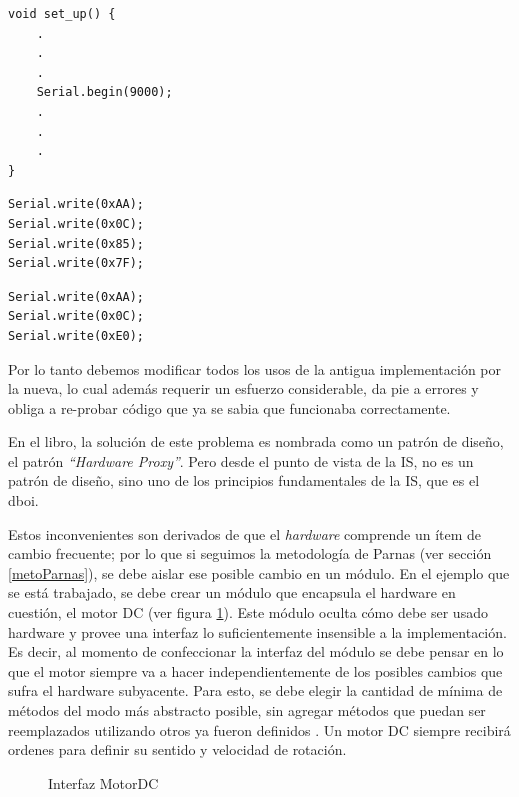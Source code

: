 \begin{itemize}
\begin{lstlisting}[caption=Configuración del motor paso a paso que utiliza comunicación serie., label={listingDistinto}]
void set_up() {
    .
    .
    .
    Serial.begin(9000);
    .
    .
    .
}
    \end{lstlisting}
\begin{lstlisting}[caption=Configurar máxima velocidad giro horario para el caso de comunicación en serie., label={maxSerial}]
Serial.write(0xAA);
Serial.write(0x0C);
Serial.write(0x85);
Serial.write(0x7F);
\end{lstlisting}
\begin{lstlisting}[caption=Configurar detención para el caso de comunicación en serie., label={detSerial}]
Serial.write(0xAA);
Serial.write(0x0C);
Serial.write(0xE0);
\end{lstlisting}
    Por lo tanto debemos modificar todos los usos de la antigua implementación por la nueva, lo cual además requerir un esfuerzo considerable, da pie a errores y obliga a re-probar código que ya se sabia que funcionaba correctamente.
\end{itemize}

En el libro, la solución de este problema es nombrada como un patrón de diseño, el patrón \textit{``Hardware Proxy''}. Pero desde el punto de vista de la IS, no es un patrón de diseño, sino uno de los principios fundamentales de la  IS, que es el \gls{dboi}.

Estos inconvenientes son derivados de que el \textit{hardware} comprende un ítem de cambio frecuente; por lo que si seguimos la metodología de Parnas (ver sección \ref{metoParnas}), se debe aislar ese posible cambio en un módulo. En el ejemplo que se está trabajado, se debe crear un módulo que encapsula el hardware en cuestión, el motor \gls{DC} (ver figura \ref{interfazMotor}). Este módulo oculta cómo debe ser usado hardware y provee una interfaz lo suficientemente insensible a la implementación. Es decir, al momento de confeccionar la interfaz del módulo se debe pensar en lo que el motor siempre va a hacer independientemente de los posibles cambios que sufra el hardware subyacente. Para esto, se debe elegir la cantidad de mínima de métodos del modo más abstracto posible, sin agregar métodos que puedan ser reemplazados utilizando otros ya fueron definidos \cite{Parnas02, parnas1977abstract}.
Un motor \gls{DC} siempre recibirá ordenes para definir su sentido y velocidad de rotación.

\begin{figure}[H]
\caption{Interfaz MotorDC}
\label{interfazMotor}
\begin{center}
\end{center}
\end{figure}

